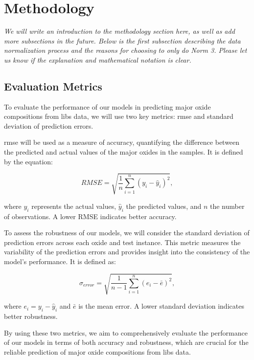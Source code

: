 \section{Methodology}\label{sec:methodology}
\textit{We will write an introduction to the methodology section here, as well as add more subsections in the future. Below is the first subsection describing the data normalization process and the reasons for choosing to only do Norm 3. Please let us know if the explanation and mathematical notation is clear.}

\subsection{Evaluation Metrics}
To evaluate the performance of our models in predicting major oxide compositions from \gls{libs} data, we will use two key metrics: \gls{rmse} and standard deviation of prediction errors.

\gls{rmse} will be used as a measure of accuracy, quantifying the difference between the predicted and actual values of the major oxides in the samples. It is defined by the equation:

\begin{equation}
    RMSE = \sqrt{\frac{1}{n} \sum_{i=1}^{n} (y_i - \hat{y}_i)^2},
\end{equation}

where $y_i$ represents the actual values, $\hat{y}_i$ the predicted values, and $n$ the number of observations. A lower RMSE indicates better accuracy.

To assess the robustness of our models, we will consider the standard deviation of prediction errors across each oxide and test instance. This metric measures the variability of the prediction errors and provides insight into the consistency of the model's performance. It is defined as:

\begin{equation}
    \sigma_{error} = \sqrt{\frac{1}{n-1} \sum_{i=1}^{n} (e_i - \bar{e})^2},
\end{equation}

where $e_i = y_i - \hat{y}_i$ and $\bar{e}$ is the mean error. A lower standard deviation indicates better robustness.

By using these two metrics, we aim to comprehensively evaluate the performance of our models in terms of both accuracy and robustness, which are crucial for the reliable prediction of major oxide compositions from \gls{libs} data.
